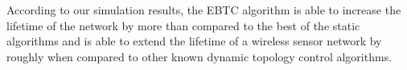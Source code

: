 \documentclass[journal,12pt,onecolumn]{IEEEtran}
\begin{document}
According to our simulation results, the EBTC algorithm is able to
increase the lifetime of the network by more than  compared to the best
of the static algorithms and is able to extend the
lifetime of a wireless sensor network by roughly  when compared
to other known dynamic topology control algorithms.







\end{document}

